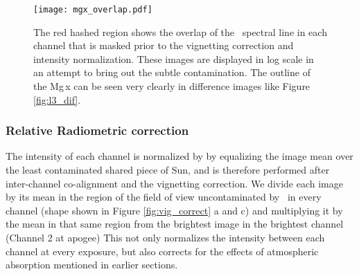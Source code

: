         
  
        
        \begin{figure}[htb!]
        	\centering
        	\texttt{[image: mgx\_overlap.pdf]}
        	\caption{The red hashed region shows the overlap of the \mgxbright \ spectral line in each channel that is masked prior to the vignetting correction and intensity normalization. These images are displayed in log scale in an attempt to bring out the subtle contamination.  The outline of the Mg\,{\sc x} can be seen very clearly in difference images like Figure \ref{fig:l3_dif}. }

        	\label{fig:mgx_overlap}
        \end{figure}
        
        

        
    \subsubsection{Relative Radiometric correction }
        The intensity of each channel is normalized by by equalizing the image mean over the least contaminated shared piece of Sun, and is therefore performed after inter-channel co-alignment and the vignetting correction.
        We divide each image by its mean in the region of the field of view uncontaminated by \mgxbright \ in every channel (shape shown in Figure \ref{fig:vig_correct} a and c) and multiplying it by the mean in that same region from the brightest image in the brightest channel (Channel 2 at apogee)
        This not only normalizes the intensity between each channel at every exposure, but also corrects for the effects of atmospheric absorption mentioned in earlier sections. 


